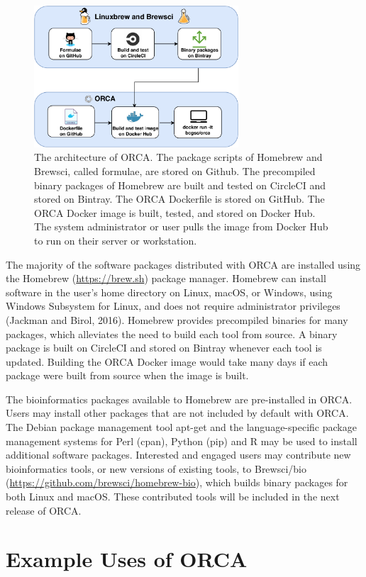 \documentclass{bioinfo}
\begin{document}
\begin{figure}[b]
\centering
\includegraphics[width=3in]{figures/architecture.pdf}
\caption{The architecture of ORCA. The package scripts of Homebrew and Brewsci, called formulae, are stored on Github. The precompiled binary packages of Homebrew are built and tested on CircleCI and stored on Bintray. The ORCA Dockerfile is stored on GitHub. The ORCA Docker image is built, tested, and stored on Docker Hub. The system administrator or user pulls the image from Docker Hub to run on their server or workstation.}
\label{fig:orca}
\end{figure}

The majority of the software packages distributed with ORCA are installed using the Homebrew (\url{https://brew.sh}) package manager. Homebrew can install software in the user's home directory on Linux, macOS, or Windows, using Windows Subsystem for Linux, and does not require administrator privileges (Jackman and Birol, 2016). Homebrew provides precompiled binaries for many packages, which alleviates the need to build each tool from source. A binary package is built on CircleCI and stored on Bintray whenever each tool is updated. Building the ORCA Docker image would take many days if each package were built from source when the image is built.

The bioinformatics packages available to Homebrew are pre-installed in ORCA. Users may install other packages that are not included by default with ORCA. The Debian package management tool apt-get and the language-specific package management systems for Perl (cpan), Python (pip) and R may be used to install additional software packages. Interested and engaged users may contribute new bioinformatics tools, or new versions of existing tools, to Brewsci/bio (\url{https://github.com/brewsci/homebrew-bio}), which builds binary packages for both Linux and macOS. These contributed tools will be included in the next release of ORCA.

\section{Example Uses of ORCA}
\end{document}
